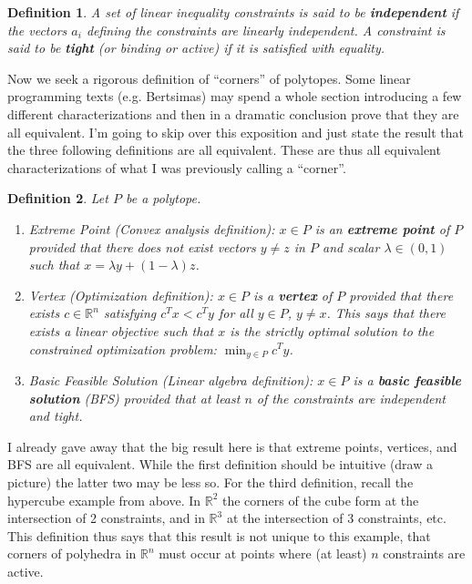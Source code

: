 \documentclass[12pt]{article}
\newcommand{\R}{\mathcal{R}}
\def\R{\mathbb{R}}
\newtheorem{definition}{Definition}
\begin{document}
\begin{definition}
A set of linear inequality constraints is said to be \textbf{independent} if the vectors $a_i$ defining the constraints are linearly independent. A constraint is said to be 
\textbf{tight} (or binding or active) if it is satisfied with equality.  
\end{definition}

Now we seek a rigorous definition of ``corners'' of polytopes. Some linear programming texts (e.g. Bertsimas) may spend a whole section introducing a few different characterizations
and then in a dramatic conclusion prove that they are all equivalent. I'm going to skip over this exposition and just state  the result that the three following definitions are all equivalent. 
These are thus all equivalent characterizations of what I was previously calling a ``corner''. 
\begin{definition}
Let $P$ be a polytope. 
\begin{enumerate} 
\item Extreme Point (Convex analysis definition): $x \in P$ is an \textbf{extreme point} of $P$ provided that there does not exist vectors $y \neq z$ in $P$ and scalar $\lambda \in (0, 1)$
such that $x = \lambda y + (1 - \lambda)z$. 
\item Vertex (Optimization definition): $x \in P$ is a \textbf{vertex} of $P$ provided that there exists $c \in \R^n$ satisfying $c^T x < c^T y$ for all $y \in P$, $y \neq x$. This says that there
exists a linear objective such that $x$ is the strictly optimal solution to the constrained optimization problem: $\min_{y \in P} c^T y$. 
\item Basic Feasible Solution (Linear algebra definition): $x \in P$ is a \textbf{basic feasible solution} (BFS) provided that at least $n$ of the constraints are independent and tight. 
\end{enumerate}
\end{definition}
I already gave away that the big result here is that extreme points, vertices, and BFS are all equivalent. While the first definition should be intuitive (draw a picture) the latter two may be 
less so. For the third definition, recall the hypercube example from above. In $\R^2$ the corners of the cube form at the intersection of 2 constraints, and in $\R^3$ at the intersection 
of 3 constraints, etc. This definition thus says that this result is not unique to this example, that corners of polyhedra in $\R^n$ must occur at points where (at least) $n$ constraints 
are active. 
\end{document}

